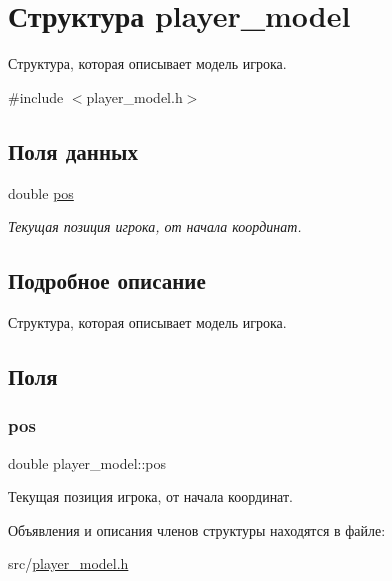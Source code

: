 \hypertarget{structplayer__model}{}\section{Структура player\+\_\+model}
\label{structplayer__model}


Структура, которая описывает модель игрока.  




{\ttfamily \#include $<$player\+\_\+model.\+h$>$}

\subsection*{Поля данных}
\begin{DoxyCompactItemize}
\item 
double \hyperlink{structplayer__model_a6364606a63d3b516cb5034c99a5bfa11}{pos}
\begin{DoxyCompactList}\small\item\em Текущая позиция игрока, от начала координат. \end{DoxyCompactList}\end{DoxyCompactItemize}


\subsection{Подробное описание}
Структура, которая описывает модель игрока. 

\subsection{Поля}
\mbox{\label{structplayer__model_a6364606a63d3b516cb5034c99a5bfa11}} 
\subsubsection{\texorpdfstring{pos}{pos}}
{\footnotesize\ttfamily double player\+\_\+model\+::pos}



Текущая позиция игрока, от начала координат. 



Объявления и описания членов структуры находятся в файле\+:\begin{DoxyCompactItemize}
\item 
src/\hyperlink{player__model_8h}{player\+\_\+model.\+h}\end{DoxyCompactItemize}
